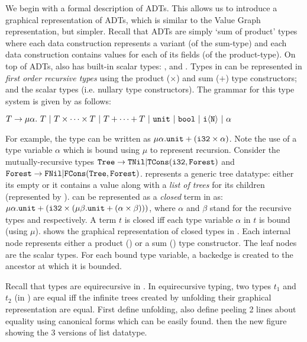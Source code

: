 We begin with a formal description of ADTs.
This allows us to introduce a graphical representation of ADTs, which is similar to the Value Graph representation, but simpler.
Recall that ADTs are simply `sum of product' types where each data construction represents a variant (of the sum-type) and
each data construction contains values for each of its fields (of the product-type).
On top of ADTs, \SpecL{} also has built-in scalar types: ,  and .
Types in \SpecL{} can be represented in {\em first order recursive types} using the product ($\times$) and sum ($+$) type
constructors; and the scalar types (i.e. nullary type constructors).
The grammar for this type system is given by \typegrammar{} as follows:

$T \rightarrow \mu \alpha. \ T \ |\ T \times \dots \times T \ |\  T + \dots + T \ |\  \type{unit} \ |\ \type{bool} \ |\  \type{i\langle N \rangle} \ |\ \alpha$

For example, the  type can be written as $\mu \alpha. {\tt unit} + ({\tt i32} \times \alpha)$.
Note the use of a type variable $\alpha$ which is bound using $\mu$ to represent recursion.
Consider the mutually-recursive types ${\tt Tree} \rightarrow {\tt TNil} | {\tt TCons}({\tt i32}, {\tt Forest})$
and ${\tt Forest} \rightarrow {\tt FNil} | {\tt FCons}({\tt Tree}, {\tt Forest})$.
 represents a generic  tree datatype: either its empty or it contains
a value along with a {\em list of trees} for its children (represented by ).
 can be represented as a {\em closed} term in \typegrammar{} as:
$\mu \alpha. {\tt unit} + ({\tt i32} \times (\mu \beta. {\tt unit + (\alpha \times \beta)}))$,
where $\alpha$ and $\beta$ stand for the recursive types  and  respectively.
A term $t$ is closed iff each type variable $\alpha$ in $t$ is bound (using $\mu$).
 shows the graphical representation of closed types in \typegrammar{}.
Each internal node represents either a product (\circled{$\times$}) or a sum (\circled{$+$}) type constructor.
The leaf nodes are the scalar types.
For each bound type variable, a backedge is created to the ancestor at which it is bounded.


Recall that types are equirecursive in \SpecL{}.
In equirecursive typing, two types $t_1$ and $t_2$ (in \typegrammar{}) are equal
iff the infinite trees created by unfolding their graphical representation are equal.
First define unfolding, also define peeling
2 lines about equality using canonical forms which can be easily found.
then the new figure showing the 3 versions of list datatype.

